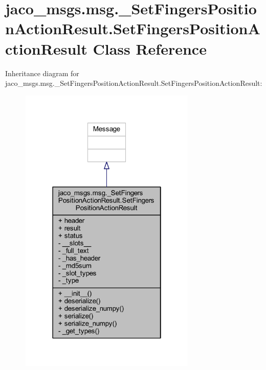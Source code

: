 \hypertarget{classjaco__msgs_1_1msg_1_1__SetFingersPositionActionResult_1_1SetFingersPositionActionResult}{}\section{jaco\+\_\+msgs.\+msg.\+\_\+\+Set\+Fingers\+Position\+Action\+Result.\+Set\+Fingers\+Position\+Action\+Result Class Reference}
\label{classjaco__msgs_1_1msg_1_1__SetFingersPositionActionResult_1_1SetFingersPositionActionResult}


Inheritance diagram for jaco\+\_\+msgs.\+msg.\+\_\+\+Set\+Fingers\+Position\+Action\+Result.\+Set\+Fingers\+Position\+Action\+Result\+:
\nopagebreak
\begin{figure}[H]
\begin{center}
\leavevmode
\includegraphics[width=238pt]{d1/d00/classjaco__msgs_1_1msg_1_1__SetFingersPositionActionResult_1_1SetFingersPositionActionResult__inherit__graph}
\end{center}
\end{figure}


